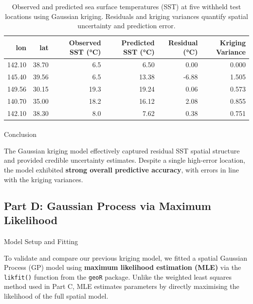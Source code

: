 \documentclass[
  11pt,
]{article}
\makeatletter
\let\oldparagraph\paragraph
\renewcommand{\paragraph}{
    \@ifstar
      \xxxParagraphStar
      \xxxParagraphNoStar
  }
\newcommand{\xxxParagraphStar}[1]{\oldparagraph*{#1}\mbox{}}
\newcommand{\xxxParagraphNoStar}[1]{\oldparagraph{#1}\mbox{}}
\makeatother
\begin{document}
\begin{table}

\caption{Observed and predicted sea surface temperatures (SST) at five withheld
test locations using Gaussian kriging. Residuals and kriging variances
quantify spatial uncertainty and prediction error.}
\centering
\begin{tabular}[t]{rrrrrr}
\toprule
lon & lat & Observed SST (°C) & Predicted SST (°C) & Residual (°C) & Kriging Variance\\
\midrule
142.10 & 38.70 & 6.5 & 6.50 & 0.00 & 0.000\\
145.40 & 39.56 & 6.5 & 13.38 & -6.88 & 1.505\\
149.56 & 30.15 & 19.3 & 19.24 & 0.06 & 0.573\\
140.70 & 35.00 & 18.2 & 16.12 & 2.08 & 0.855\\
142.10 & 38.30 & 8.0 & 7.62 & 0.38 & 0.751\\
\bottomrule
\end{tabular}
\end{table}

\paragraph{Conclusion}\label{conclusion}

The Gaussian kriging model effectively captured residual SST spatial
structure and provided credible uncertainty estimates. Despite a single
high-error location, the model exhibited \textbf{strong overall
predictive accuracy}, with errors in line with the kriging variances.

\subsection{Part D: Gaussian Process via Maximum
Likelihood}\label{part-d-gaussian-process-via-maximum-likelihood}

\paragraph{Model Setup and Fitting}\label{model-setup-and-fitting}

To validate and compare our previous kriging model, we fitted a spatial
Gaussian Process (GP) model using \textbf{maximum likelihood estimation
(MLE)} via the \texttt{likfit()} function from the \texttt{geoR}
package. Unlike the weighted least squares method used in Part C, MLE
estimates parameters by directly maximising the likelihood of the full
spatial model.
\end{document}
